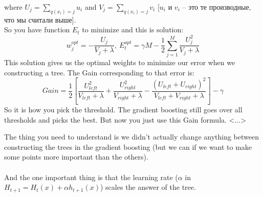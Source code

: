\begin{enumerate}
  where $U_j=\sum\limits_{q(x_i)=j}u_i$ and $V_j=\sum\limits_{q(x_i)=j}v_i$ [$u_i$ и $v_i$ -- это те производные, что мы считали выше].\\
  So you have function $E_t$ to minimize and this is solution:
  $$w_j^{opt}=-\frac{U_j}{V_j+\lambda},\ E_t^{opt}=\gamma M-\frac{1}{2}\sum\limits_{j=1}^M\frac{U_j^2}{V_j+\lambda}$$
  This solution gives us the optimal weights to minimize our error when we constructing a tree. The Gain corresponding to that error is:
  $$Gain = \frac{1}{2}\left[\frac{U_{left}^2}{V_{left}+\lambda}+\frac{U_{right}^2}{V_{right}+\lambda}-\frac{(U_{left}+U_{right})^2}{V_{left}+V_{right}+\lambda}\right]-\gamma$$
  So it is how you pick the threshold. The gradient boosting still goes over all thresholds and picks the best. But now you just use this Gain formula. <...>
\end{enumerate}
The thing you need to understand is we didn't actually change anything between constructing the trees in the gradient boosting (but we can if we want to make some points more important than the others).\\
{\it <Smth about CatBoost>}\\
And the one important thing is that the learning rate ($\alpha$ in $H_{t+1}=H_t(x)+\alpha h_{t+1}(x)$) scales the answer of the tree.